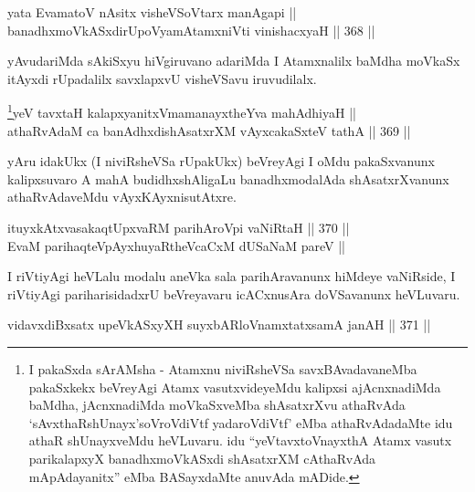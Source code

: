 
\begin{shl}
yata EvamatoV nAsitx visheVSoV\s tarx manAgapi || \\
banadhxmoVkASxdirUpoV\s yamAtamxniVti vinishacxyaH \hfill || 368 ||  
\end{shl}

\begin{artha}
yAvudariMda sAkiSxyu hiVgiruvano adariMda I Atamxnalilx baMdha moVkaSx
itAyxdi rUpadalilx savxlapxvU visheVSavu iruvudilalx.
\end{artha}


\begin{shl}
\footnote{I pakaSxda sArAMsha - Atamxnu niviRsheVSa savxBAvadavaneMba
pakaSxkekx beVreyAgi Atamx vasutxvideyeMdu kalipxsi ajAcnxnadiMda
baMdha, jAcnxnadiMda moVkaSxveMba shAsatxrXvu athaRvAda
`sAvxthaRshUnayx'soV\s roVdiVtf yadaroVdiVtf' eMba athaRvAdadaMte
idu athaR shUnayxveMdu heVLuvaru. idu ``yeVtavxtoVnayxthA Atamx vasutx parikalapxyX banadhxmoVkASxdi shAsatxrXM cAthaRvAda mApAdayanitx'' eMba BASayxdaMte
anuvAda mADide.}yeV tavxtaH kalapxyanitxVmamanayxtheYva mahAdhiyaH || \\
athaRvAdaM ca banAdhxdishAsatxrXM vAyxcakaSxteV tathA \hfill || 369 ||  
\end{shl}

\begin{artha}
yAru idakUkx (I niviRsheVSa rUpakUkx) beVreyAgi I oMdu
pakaSxvanunx kalipxsuvaro A mahA budidhxshAligaLu banadhxmodalAda
shAsatxrXvanunx athaRvAdaveMdu vAyxKAyxnisutAtxre.
\end{artha}

\begin{shl}
ituyxkAtxvasakaqtUpxvaRM parihAroV\s pi vaNiRtaH \hfill || 370 ||  \\
EvaM parihaqteV\s pAyxhuyaRtheVcaCxM dUSaNaM pareV ||
\end{shl}

\begin{artha}
I riVtiyAgi heVLalu modalu aneVka sala parihAravanunx hiMdeye
vaNiRside, I riVtiyAgi pariharisidadxrU beVreyavaru icACxnusAra
doVSavanunx heVLuvaru.
\end{artha}

\begin{shl}
vidavxdiBxsatx upeVkASxyXH suyxbARloVnamxtatxsamA janAH \hfill || 371 ||  
\end{shl}

